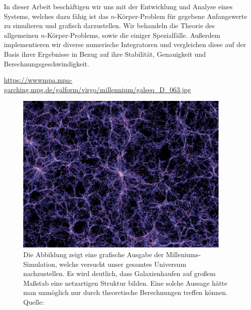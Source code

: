   In dieser Arbeit beschäftigen wir uns mit der Entwicklung und Analyse eines Systems, welches dazu fähig ist das $n$-Körper-Problem für gegebene Anfangswerte zu simulieren und grafisch darzustellen.
  Wir behandeln die Theorie des allgemeinen $n$-Körper-Problems, sowie die einiger Spezialfälle.
  Außerdem implementieren wir diverse numerische Integratoren und vergleichen diese auf der Basis ihrer Ergebnisse in Bezug auf ihre Stabilität, Genauigkeit und Berechnungsgeschwindigkeit.

  \urldef{\milleniumurl}\url{https://wwwmpa.mpa-garching.mpg.de/galform/virgo/millennium/galseq_D_063.jpg}
  \begin{figure}[h]
    \center
    \includegraphics[width=0.95\textwidth]{pictures/millenium.jpg}
    \caption{Die Abbildung zeigt eine grafische Ausgabe der Milleniums-Simulation, welche versucht unser gesamtes Universum nachzustellen. Es wird deutlich, dass Galaxienhaufen auf großem Maßstab eine netzartigen Struktur bilden. Eine solche Aussage hätte man unmöglich nur durch theoretische Berechnungen treffen können. \\ Quelle: \\ \milleniumurl}
    \label{fig:millenium}
  \end{figure}

